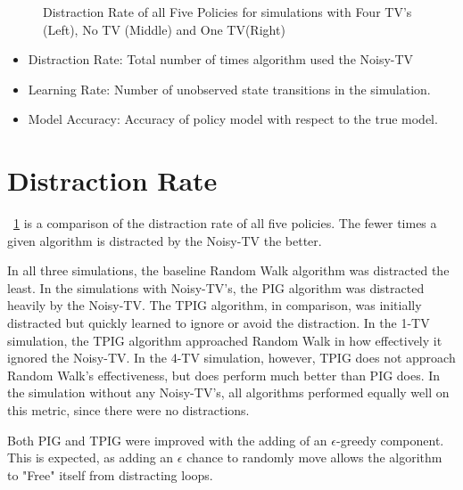 \documentclass[12pt]{thesis}
\begin{document}
\begin{figure}
\begin{center}
	\end{center}
	\caption{Distraction Rate of all Five Policies for simulations with Four TV's (Left), No TV (Middle) and One TV(Right)}
	\label{Fig:DRFP}
\end{figure}

\begin{itemize}[]
	\item Distraction Rate: Total number of times algorithm used the Noisy-TV
	\item Learning Rate: Number of unobserved state transitions in the simulation.
	\item Model Accuracy: Accuracy of policy model with respect to the true model.
\end{itemize}

\section{Distraction Rate}
\figurename~\ref{Fig:DRFP} is a comparison of the distraction rate of all five policies. The fewer times a given algorithm is distracted by the Noisy-TV the better.

In all three simulations, the baseline Random Walk algorithm was distracted the least. In the simulations with Noisy-TV's, the PIG algorithm was distracted heavily by the Noisy-TV. The TPIG algorithm, in comparison, was initially distracted but quickly learned to ignore or avoid the distraction. In the 1-TV simulation, the TPIG algorithm approached Random Walk in how effectively it ignored the Noisy-TV. In the 4-TV simulation, however, TPIG does not approach Random Walk's effectiveness, but does perform much better than PIG does. In the simulation without any Noisy-TV's, all algorithms performed equally well on this metric, since there were no distractions.


Both PIG and TPIG were improved with the adding of an $\epsilon$-greedy component. This is expected, as adding an $\epsilon$ chance to randomly move allows the algorithm to "Free" itself from distracting loops.
\end{document}
